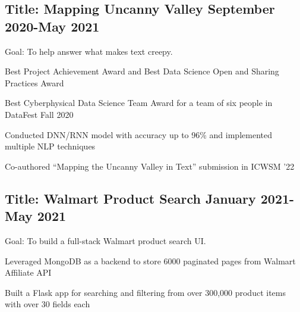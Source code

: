\documentclass[11pt]{article}
\begin{document}
\subsection*{Title: Mapping Uncanny Valley \hfill {\normalfont September
        2020-May 2021}}
\noindent
\href{https://github.com/Anthonyive/Research-Mapping-Uncanny-Valley.git}{} Goal: To help answer what makes text creepy.
\begin{compactitem}
    \item Best Project Achievement Award and Best Data Science Open and
    Sharing Practices Award
    \item Best Cyberphysical Data Science Team Award for a team of six people
    in DataFest Fall 2020
    \item Conducted DNN/RNN model with accuracy up to 96\% and implemented
    multiple NLP techniques
    \item Co-authored ``Mapping the Uncanny Valley in Text'' submission in
    ICWSM '22
\end{compactitem}

\subsection*{Title: Walmart Product Search \hfill {\normalfont January 2021-May 2021}}
\noindent
\href{https://github.com/Anthonyive/DSCI-551-Project.git}{} Goal: To build a full-stack Walmart product search UI.
\begin{compactitem}
    \item Leveraged MongoDB as a backend to store 6000 paginated pages from Walmart
    Affiliate API
    \item Built a Flask app for searching and filtering from over 300,000
    product items with over 30 fields each
\end{compactitem}

\end{document}
